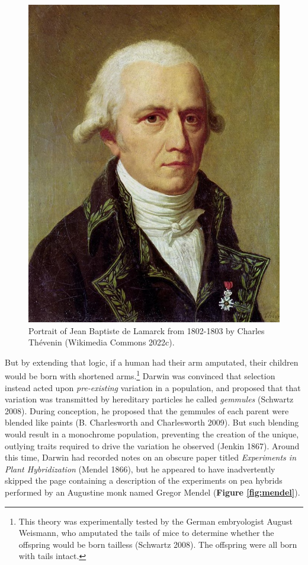 \documentclass[
]{book}
\begin{document}
\begin{figure}

{\centering \includegraphics[width=0.5\linewidth]{figs/introduction/Jean-Baptiste_de_Lamarck} 

}

\caption{Portrait of Jean Baptiste de Lamarck from 1802-1803 by Charles Thévenin (Wikimedia Commons 2022c).}\label{fig:lamarck}
\end{figure}

But by extending that logic, if a human had their arm amputated, their children would be born with shortened arms.\footnote{This theory was experimentally tested by the German embryologist August Weismann, who amputated the tails of mice to determine whether the offspring would be born tailless (Schwartz 2008). The offspring were all born with tails intact.} Darwin was convinced that selection instead acted upon \emph{pre-existing} variation in a population, and proposed that that variation was transmitted by hereditary particles he called \emph{gemmules} (Schwartz 2008). During conception, he proposed that the gemmules of each parent were blended like paints (B. Charlesworth and Charlesworth 2009). But such blending would result in a monochrome population, preventing the creation of the unique, outlying traits required to drive the variation he observed (Jenkin 1867). Around this time, Darwin had recorded notes on an obscure paper titled \emph{Experiments in Plant Hybridization} (Mendel 1866), but he appeared to have inadvertently skipped the page containing a description of the experiments on pea hybrids performed by an Augustine monk named Gregor Mendel (\textbf{Figure \ref{fig:mendel}}).
\end{document}
